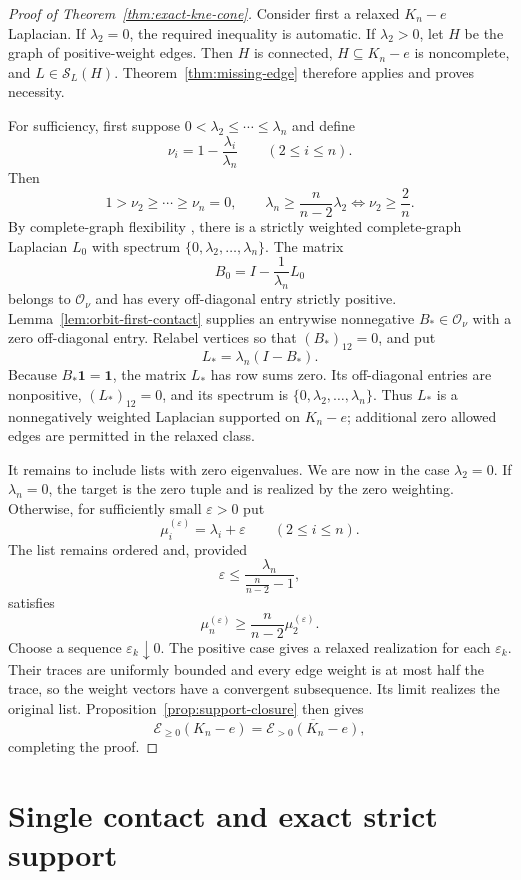 \documentclass[11pt,reqno]{amsart}
\theoremstyle{definition}
\theoremstyle{remark}
\newcommand{\one}{\mathbf 1}
\newcommand{\SL}{\mathcal S_L}
\begin{document}
\begin{proof}[Proof of Theorem~\ref{thm:exact-kne-cone}]
Consider first a relaxed $K_n-e$ Laplacian.  If $\lambda_2=0$, the required
inequality is automatic.  If $\lambda_2>0$, let $H$ be the graph of
positive-weight edges.  Then $H$ is connected, $H\subseteq K_n-e$ is
noncomplete, and $L\in\SL(H)$.  Theorem~\ref{thm:missing-edge} therefore
applies and proves necessity.

For sufficiency, first suppose
$0<\lambda_2\le\cdots\le\lambda_n$ and define
\[
  \nu_i=1-\frac{\lambda_i}{\lambda_n}
  \qquad(2\le i\le n).
\]
Then
\[
  1>\nu_2\ge\cdots\ge\nu_n=0,
  \qquad
  \lambda_n\ge\frac{n}{n-2}\lambda_2
  \iff \nu_2\ge\frac2n.
\]
By complete-graph flexibility \cite[Theorem~2.5]{FGL2025}, there is a
strictly weighted complete-graph Laplacian $L_0$ with spectrum
$\{0,\lambda_2,\ldots,\lambda_n\}$.  The matrix
\[
  B_0=I-\frac1{\lambda_n}L_0
\]
belongs to $\mathcal O_\nu$ and has every off-diagonal entry strictly
positive.  Lemma~\ref{lem:orbit-first-contact} supplies an entrywise
nonnegative $B_*\in\mathcal O_\nu$ with a zero off-diagonal entry.  Relabel
vertices so that $(B_*)_{12}=0$, and put
\[
  L_*=\lambda_n(I-B_*).
\]
Because $B_*\one=\one$, the matrix $L_*$ has row sums zero.  Its
off-diagonal entries are nonpositive, $(L_*)_{12}=0$, and its spectrum is
$\{0,\lambda_2,\ldots,\lambda_n\}$.  Thus $L_*$ is a nonnegatively weighted
Laplacian supported on $K_n-e$; additional zero allowed edges are permitted
in the relaxed class.

It remains to include lists with zero eigenvalues.  We are now in the case
$\lambda_2=0$.  If $\lambda_n=0$, the
target is the zero tuple and is realized by the zero weighting.  Otherwise,
for sufficiently small $\varepsilon>0$ put
\[
  \mu_i^{(\varepsilon)}=\lambda_i+\varepsilon
  \qquad(2\le i\le n).
\]
The list remains ordered and, provided
\[
  \varepsilon\le
  \frac{\lambda_n}{\frac{n}{n-2}-1},
\]
satisfies
\[
  \mu_n^{(\varepsilon)}
  \ge\frac{n}{n-2}\mu_2^{(\varepsilon)}.
\]
Choose a sequence $\varepsilon_k\downarrow0$.  The positive case gives a
relaxed realization for each $\varepsilon_k$.  Their traces are uniformly
bounded and every edge weight is at most half the trace, so the weight
vectors have a convergent subsequence.  Its limit realizes the original
list.  Proposition~\ref{prop:support-closure}
then gives
\[
  \mathcal E_{\ge0}(K_n-e)
  =\overline{\mathcal E_{>0}(K_n-e)},
\]
completing the proof.
\end{proof}

\section{Single contact and exact strict support}
\label{sec:single-contact}
\end{document}
